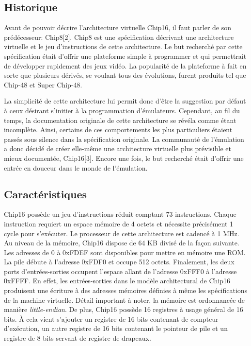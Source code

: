 \documentclass{article} %
\begin{document}
\subsection{Historique}
Avant de pouvoir décrire l'architecture virtuelle Chip16, il faut parler de son prédécesseur: Chip8[2]. Chip8 est une spécification décrivant une architecture virtuelle et le jeu d'instructions de cette architecture. Le but recherché par cette spécification était d'offrir une plateforme simple à programmer et qui permettrait de développer rapidement des jeux vidéo. La popularité de la plateforme à fait en sorte que plusieurs dérivés, se voulant tous des évolutions, furent produits tel que Chip-48 et Super Chip-48.

La simplicité de cette architecture lui permit donc d'être la suggestion par défaut à ceux désirant s'initier à la programmation d'émulateurs. Cependant, au fil du temps, la documentation originale de cette architecture se révéla comme étant incomplète. Ainsi, certains de ces comportements les plus particuliers étaient passés sous silence dans la spécification originale. La communauté de l'émulation a donc décidé de créer elle-même une architecture virtuelle plus prévisible et mieux documentée, Chip16[3]. Encore une fois, le but recherché était d'offrir une entrée en douceur dans le monde de l'émulation.

\subsection{Caractéristiques}
Chip16 possède un jeu d'instructions réduit comptant 73 instructions. Chaque instruction requiert un espace mémoire de 4 octets et nécessite précisément 1 cycle pour s'exécuter. Le processeur de cette architecture est cadencé à 1 MHz. Au niveau de la mémoire, Chip16 dispose de 64 KB divisé de la façon suivante. Les adresses de 0 à 0xFDEF sont disponibles pour mettre en mémoire une ROM. La pile débute à l'adresse 0xFDF0 et occupe 512 octets. Finalement, les deux ports d'entrées-sorties occupent l'espace allant de l'adresse 0xFFF0 à l'adresse 0xFFFF. En effet, les entrées-sorties dans le modèle architectural de Chip16 produisent une écriture à des adresses mémoires définies à même les spécifications de la machine virtuelle. Détail important à noter, la mémoire est ordonnancée de manière \textit{little-endian}. De plus, Chip16 possède 16 registres à usage général de 16 bits. À cela vient s'ajouter un registre de 16 bits contenant de compteur d'exécution, un autre registre de 16 bits contenant le  pointeur de pile et un registre de 8 bits servant de registre de drapeaux. 
\end{document}
